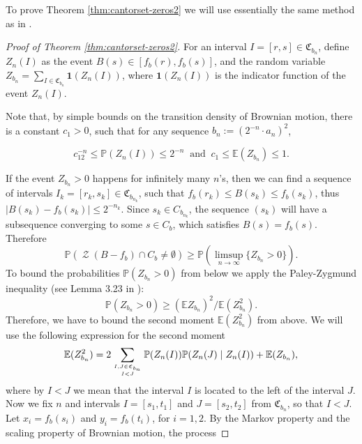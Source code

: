 \documentclass[11pt,reqno]{amsart}
\theoremstyle{plain}
\theoremstyle{definition}
\theoremstyle{remark}
\begin{document}
To prove Theorem \ref{thm:cantorset-zeros2} we will use essentially the same method as in \cite{ABPR}.

\begin{proof}[Proof of Theorem \ref{thm:cantorset-zeros2}]
For an interval $I=[r,s] \in \mathfrak{C}_{b_n}$, define $Z_n(I)$ as the event $B(s) \in [f_b(r),f_b(s)]$, and the random variable $Z_{b_n} = \sum_{I \in \mathfrak{C}_{b_n}}\mathbf{1}(Z_n(I))$, where $\mathbf{1}(Z_n(I))$ is the indicator function of the event $Z_n(I)$.

Note that, by simple bounds on the transition density of Brownian motion, there is a constant $c_1>0$, such that for any sequence $b_{n}:= (2^{-n} \cdot a_{n})^2$, 

\begin{equation}\label{eq: hitting probabilities}
c_12^{-n} \leq \mathbb{P}(Z_n(I)) \leq 2^{-n} \ \text{ and } \ c_1 \leq \mathbb{E}(Z_{b_n}) \leq 1.
\end{equation}

If the event $Z_{b_n}>0$ happens for infinitely many $n$'s, then we can find a sequence of intervals $I_k=[r_k,s_k] \in \mathfrak{C}_{b_{n_k}}$, such that $f_{b}(r_k) \leq B(s_k) \leq f_{b}(s_k)$, thus $|B(s_k) - f_b(s_k)| \leq 2^{-n_k}$. Since $s_k \in C_{b_{n_k}}$, the sequence $(s_k)$ will have a subsequence converging to some $s \in C_b$, which satisfies $B(s)=f_b(s)$.
Therefore
\begin{equation}\label{eq: approximation of probabilities_1}
\mathbb{P}(\operatorname{\mathcal{Z}}(B-f_b) \cap C_{b} \neq \emptyset) \geq \mathbb{P}(\limsup_{n\rightarrow \infty} \{Z_{b_n}>0\}).
\end{equation}
To bound the probabilities $\mathbb{P}(Z_{b_n}>0)$ from below we apply the Paley-Zygmund inequality 
(see Lemma 3.23 in \cite{MP}):
\begin{equation*}\mathbb{P}(Z_{b_n}>0) \geq (\mathbb{E} Z_{b_n})^2/\mathbb{E} (Z_{b_n}^2).
\end{equation*}
Therefore, we have to bound the second moment $\mathbb{E}(Z_{b_n}^2)$ from above. We will use the following expression for the second moment
\begin{equation}\label{eq: second moment}
\mathbb{E}(Z_{b_n}^2) = 2\sum_{I,J \in \mathfrak{C}_{b_n} \atop I < J} \mathbb{P}(Z_n(I))\mathbb{P}(Z_n(J) \mid Z_n(I)) + \mathbb{E}(Z_{b_n}),
\end{equation}
where by $I<J$ we mean that the interval $I$ is located to the left of the interval $J$.
Now we fix $n$ and intervals $I=[s_1,t_1]$ and $J=[s_2,t_2]$ from $\mathfrak{C}_{b_n}$, so that $I<J$. Let $x_i=f_b(s_i)$ and $y_i=f_b(t_i)$, for $i=1,2$. By the Markov property and the scaling property of Brownian motion, the process 


\end{proof}
\end{document}
